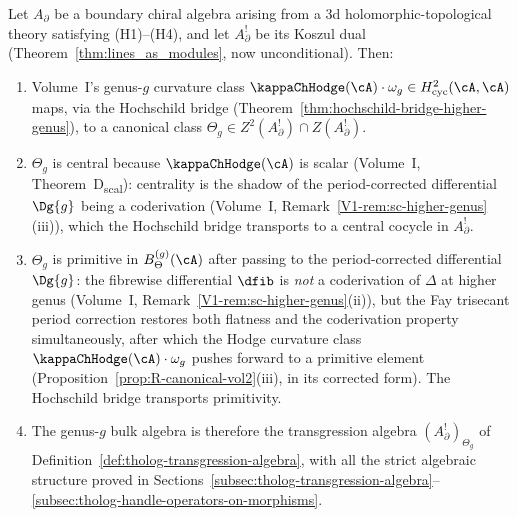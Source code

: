\begin{conjecture}
Let \(A_{\partial}\) be a boundary chiral algebra arising from a 3d
holomorphic-topological theory satisfying \textrm{(H1)--(H4)}, and
let \(A_{\partial}^{!}\) be its Koszul dual
(Theorem~\textup{\ref{thm:lines_as_modules}}, now unconditional).
Then:
\begin{enumerate}[label=\textup{(\roman*)}]
\item Volume~I's genus-\(g\) curvature class
 \(\kappaChHodge(\cA) \cdot \omega_g \in H^2_{\mathrm{cyc}}(\cA,\cA)\)
 maps, via the Hochschild bridge
 (Theorem~\textup{\ref{thm:hochschild-bridge-higher-genus}}),
 to a canonical class
 \(\Theta_g \in Z^2(A_{\partial}^{!}) \cap Z(A_{\partial}^{!})\).
\item \(\Theta_g\) is central because \(\kappaChHodge(\cA)\) is scalar
 (Volume~I, Theorem~D\textsubscript{scal}): centrality is the
 shadow of the period-corrected differential
 \(\Dg{g}\) being a coderivation
 (Volume~I, Remark~\ref{V1-rem:sc-higher-genus}\textup{(iii)}),
 which the Hochschild bridge transports to a central cocycle
 in \(A_\partial^!\).
\item \(\Theta_g\) is primitive in \(B_\Theta^{(g)}(\cA)\)
 after passing to the period-corrected differential
 \(\Dg{g}\): the fibrewise differential \(\dfib\) is
 \emph{not} a coderivation of \(\Delta\) at higher genus
 (Volume~I, Remark~\ref{V1-rem:sc-higher-genus}\textup{(ii)}),
 but the Fay trisecant period correction restores both
 flatness and the coderivation property simultaneously, after
 which the Hodge curvature class
 \(\kappaChHodge(\cA)\cdot\omega_g\) pushes forward to a primitive
 element (Proposition~\textup{\ref{prop:R-canonical-vol2}(iii)},
 in its corrected form).
 The Hochschild bridge transports primitivity.
\item The genus-\(g\) bulk algebra is therefore the transgression
 algebra \((A_{\partial}^{!})_{\Theta_g}\) of
 Definition~\textup{\ref{def:tholog-transgression-algebra}}, with
 all the strict algebraic structure proved in
 Sections~\textup{\ref{subsec:tholog-transgression-algebra}--\ref{subsec:tholog-handle-operators-on-morphisms}}.
\end{enumerate}
\end{conjecture}

